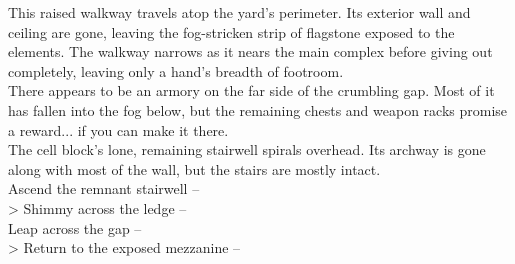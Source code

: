 This raised walkway travels atop the yard's perimeter. Its exterior wall and ceiling are gone, leaving the fog-stricken strip of flagstone exposed to the elements. The walkway narrows as it nears the main complex before giving out completely, leaving only a hand's breadth of footroom.\\

There appears to be an armory on the far side of the crumbling gap. Most of it has fallen into the fog below, but the remaining chests and weapon racks promise a reward... if you can make it there.\\

The cell block's lone, remaining stairwell spirals overhead. Its archway is gone along with most of the wall, but the stairs are mostly intact.\\

 Ascend the remnant stairwell -- \\
> Shimmy across the ledge -- \\
 Leap across the gap -- \\
> Return to the exposed mezzanine -- 